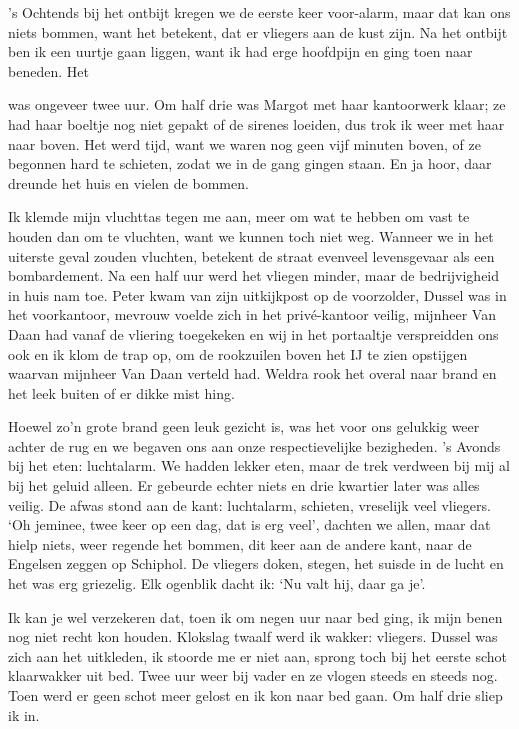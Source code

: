 \documentclass{book}
\begin{document}
's Ochtends bij het ontbijt kregen we de eerste keer voor-alarm, maar dat kan
ons niets bommen, want het betekent, dat er vliegers aan de kust zijn. Na het
ontbijt ben ik een uurtje gaan liggen, want ik had erge hoofdpijn en ging toen
naar beneden. Het

was ongeveer twee uur. Om half drie was Margot met haar kantoorwerk klaar; ze
had haar boeltje nog niet gepakt of de sirenes loeiden, dus trok ik weer met
haar naar boven. Het werd tijd, want we waren nog geen vijf minuten boven, of ze
begonnen hard te schieten, zodat we in de gang gingen staan. En ja hoor, daar
dreunde het huis en vielen de bommen.

Ik klemde mijn vluchttas tegen me aan, meer om wat te hebben om vast te houden
dan om te vluchten, want we kunnen toch niet weg. Wanneer we in het uiterste
geval zouden vluchten, betekent de straat evenveel levensgevaar als een
bombardement. Na een half uur werd het vliegen minder, maar de bedrijvigheid in
huis nam toe. Peter kwam van zijn uitkijkpost op de voorzolder, Dussel was in
het voorkantoor, mevrouw voelde zich in het privé-kantoor veilig, mijnheer Van
Daan had vanaf de vliering toegekeken en wij in het portaaltje verspreidden ons
ook en ik klom de trap op, om de rookzuilen boven het IJ te zien opstijgen
waarvan mijnheer Van Daan verteld had. Weldra rook het overal naar brand en het
leek buiten of er dikke mist hing.

Hoewel zo'n grote brand geen leuk gezicht is, was het voor ons gelukkig weer
achter de rug en we begaven ons aan onze respectievelijke bezigheden. 's Avonds
bij het eten: luchtalarm. We hadden lekker eten, maar de trek verdween bij mij
al bij het geluid alleen. Er gebeurde echter niets en drie kwartier later was
alles veilig. De afwas stond aan de kant: luchtalarm, schieten, vreselijk veel
vliegers. `Oh jeminee, twee keer op een dag, dat is erg veel', dachten we allen,
maar dat hielp niets, weer regende het bommen, dit keer aan de andere kant, naar
de Engelsen zeggen op Schiphol. De vliegers doken, stegen, het suisde in de
lucht en het was erg griezelig. Elk ogenblik dacht ik: `Nu valt hij, daar ga
je'.

Ik kan je wel verzekeren dat, toen ik om negen uur naar bed ging, ik mijn benen
nog niet recht kon houden. Klokslag twaalf werd ik wakker: vliegers. Dussel was
zich aan het uitkleden, ik stoorde me er niet aan, sprong toch bij het eerste
schot klaarwakker uit bed. Twee uur weer bij vader en ze vlogen steeds en steeds
nog. Toen werd er geen schot meer gelost en ik kon naar bed gaan. Om half drie
sliep ik in.
\end{document}
